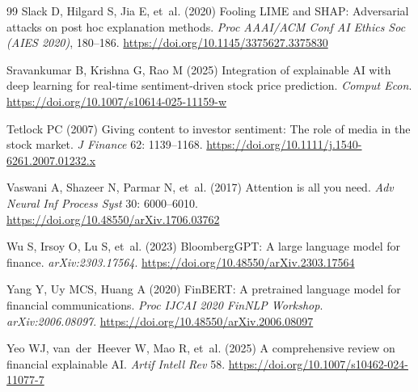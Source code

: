 \documentclass[12pt,a4paper]{article}
\begin{document}
\begin{thebibliography}{99}
Slack D, Hilgard S, Jia E, et~al. (2020) Fooling LIME and SHAP: Adversarial attacks
on post hoc explanation methods. \emph{Proc AAAI/ACM Conf AI Ethics Soc (AIES 2020)},
180--186. \url{https://doi.org/10.1145/3375627.3375830}

Sravankumar B, Krishna G, Rao M (2025) Integration of explainable AI with deep
learning for real-time sentiment-driven stock price prediction. \emph{Comput Econ}. \url{https://doi.org/10.1007/s10614-025-11159-w}

Tetlock PC (2007) Giving content to investor sentiment: The role of media in the
stock market. \emph{J Finance} 62: 1139--1168. \url{https://doi.org/10.1111/j.1540-6261.2007.01232.x}

Vaswani A, Shazeer N, Parmar N, et~al. (2017) Attention is all you need. \emph{Adv
Neural Inf Process Syst} 30: 6000--6010. \url{https://doi.org/10.48550/arXiv.1706.03762}

Wu S, Irsoy O, Lu S, et~al. (2023) BloombergGPT: A large language model for finance.
\emph{arXiv:2303.17564}. \url{https://doi.org/10.48550/arXiv.2303.17564}

Yang Y, Uy MCS, Huang A (2020) FinBERT: A pretrained language model for financial
communications. \emph{Proc IJCAI 2020 FinNLP Workshop}. \emph{arXiv:2006.08097}. \url{https://doi.org/10.48550/arXiv.2006.08097}

Yeo WJ, van~der~Heever W, Mao R, et~al. (2025) A comprehensive review on financial
explainable AI. \emph{Artif Intell Rev} 58. \url{https://doi.org/10.1007/s10462-024-11077-7}

\end{thebibliography}
\end{document}
